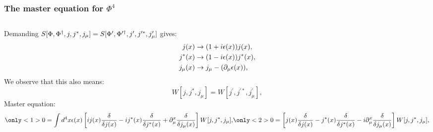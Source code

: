 \documentclass[accentcolor=tud2c,usenames,dvipsnames,colorbacktitle,inverttitle,landscape,german,presentation,t]{tudbeamer}
\begin{document}
  \begin{frame}
    \frametitle{The master equation for $\Phi^4$}
    \begin{columns}[c]
      \begin{column}{0.8\textwidth}

    Demanding $S[\Phi, \Phi^{\dagger}, j, j^{*}, j_{\mu}] = S[\Phi^{\prime}, \Phi^{\prime \dagger}, j^{\prime}, j^{\prime*}, j^{\prime}_{\mu}]$ gives:
    \begin{align*}
    j(x) & \rightarrow (1 + i \epsilon(x))j(x), \\
    j^{*}(x) & \rightarrow (1 - i \epsilon(x))j^{*}(x), \\
    j_{\mu}(x) & \rightarrow j_{\mu} - (\partial_{\mu}\epsilon(x)),
    \end{align*}
    We observe that this also means:
    \begin{equation*}
      W[j, j^{*}, j_{\mu}] = W[j^{\prime}, j^{\prime*}, j^{\prime}_{\mu}],
    \end{equation*}
    Master equation:
    \begin{equation*}
      \only<1>{0 = \int d^{4}x \epsilon(x) \left[ i j(x) \frac{\delta}{\delta j(x)} - i j^{*}(x) \frac{\delta}{\delta j^{*}(x)} + \dmulox{\frac{\delta}{\delta j_{\mu}(x)}}{x} \right] W[j, j^{*}, j_{\mu}],}
      \only<2>{0 = \left[ j(x) \frac{\delta}{\delta j(x)} - j^{*}(x) \frac{\delta}{\delta j^{*}(x)} - i \dmulox{\frac{\delta}{\delta j_{\mu}(x)}}{x} \right] W[j, j^{*}, j_{\mu}],}
    \end{equation*}
      \end{column}
    \end{columns}
  \end{frame}
\end{document}
